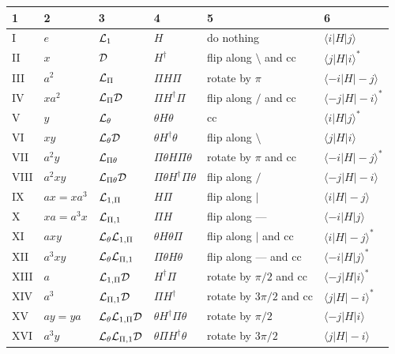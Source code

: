\begin{table}
\begin{tabular}{llllll}
  1&2&3&4&5&6\\
  \hline
  I&$e$           & ${\cal{L}}_{1}$&$H$ &do nothing&$\langle i|H| j\rangle$ \\
  II&$x$           & ${\cal{D}}$&$H^\dagger$&flip along $\setminus$ and cc&$\langle j|H| i\rangle^*$  \\
  III&$a^{2}$     & ${\cal{L}}_{\Pi}$&$\Pi H\Pi$&rotate by $\pi$&$\langle -i|H| -j\rangle$ \\
   IV&$x a^{2}$   & ${\cal{L}}_{\Pi}{\cal{D}}$&$\Pi H^\dagger \Pi$&flip along $/$ and cc &$\langle -j|H| -i\rangle^*$ \\
  V&$y$           & ${\cal{L}}_{\theta}$&$\theta H\theta$&cc&$\langle i|H| j\rangle^*$ \\
  VI&$xy$          & ${\cal{L}}_{\theta}{\cal{D}}$&$\theta H^\dagger \theta$&flip
  along $\setminus $   &$\langle j|H| i\rangle$ \\
    VII&$a^{2}y$    & ${\cal{L}}_{\Pi\theta}$&$\Pi\theta H\Pi\theta$&rotate by $\pi$ and cc&$\langle -i|H| -j\rangle^*$ \\
  VIII&$a^{2}xy$   & ${\cal{L}}_{\Pi\theta}{\cal{D}}$&$\Pi\theta H^\dagger\Pi\theta$&flip along $/$ &$\langle -j|H| -i\rangle$ \\
    IX&$ax=xa^{3}$ & ${\cal{L}}_{1,\Pi}$&$H\Pi$&flip along $\mid$ &$\langle i|H| -j\rangle$ \\
  X&$xa=a^{3}x$ & ${\cal{L}}_{\Pi,1}$&$\Pi H$&flip along --- &$\langle -i|H| j\rangle$ \\
  XI&$axy$         & ${\cal{L}}_{\theta}{\cal{L}}_{1,\Pi}$&$\theta H\theta\Pi$&flip along $|$ and cc&$\langle i|H| -j\rangle^*$ \\
  XII&$a^{3}xy$   & ${\cal{L}}_{\theta}{\cal{L}}_{\Pi,1}$&$\Pi\theta H\theta$&flip along --- and cc&$\langle -i|H| j\rangle^*$ \\
 XIII&$a$           & ${\cal{L}}_{1,\Pi}{\cal{D}}$&$H^\dagger\Pi$&rotate by $\pi/2$ and cc&$\langle -j|H| i\rangle^*$ \\
 XIV&$a^{3}$     & ${\cal{L}}_{\Pi,1}{\cal{D}}$&$\Pi H^\dagger$&rotate by $3\pi/2$ and cc&$\langle j|H| -i\rangle^*$ \\
 XV&$ay=ya$     & ${\cal{L}}_{\theta}{\cal{L}}_{1,\Pi}{\cal{D}}$&$\theta H^\dagger \Pi\theta$&rotate by $\pi/2$ &$\langle -j|H| i\rangle$ \\
  XVI&$a^{3}y$    & ${\cal{L}}_{\theta}{\cal{L}}_{\Pi,1}{\cal{D}}$&$\theta\Pi H^\dagger \theta$&rotate by $3\pi/2$&$\langle j|H| -i\rangle$\\
\end{tabular}

\end{table}
%





